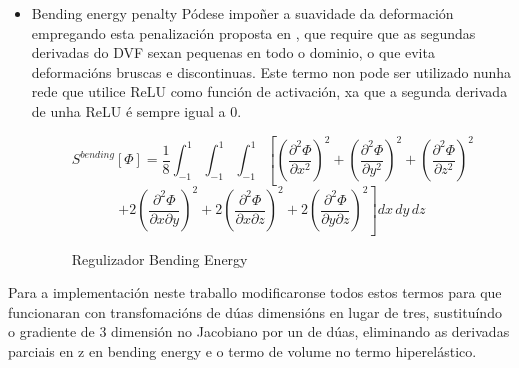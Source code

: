 \begin{itemize}
    \item Bending energy penalty
    Pódese impoñer a suavidade da deformación empregando esta penalización proposta en \cite{bendingenergy}, que 
    require que as segundas derivadas do DVF sexan pequenas en todo o dominio, o que evita deformacións bruscas e discontinuas.
    Este termo non pode ser utilizado nunha rede que utilice ReLU como función de activación, xa que a segunda derivada de unha ReLU é sempre igual a 0.

    \begin{figure}[ht!]
        \centering
        \[
        S^{bending}[\Phi] = \frac{1}{8} \int_{-1}^{1} \int_{-1}^{1} \int_{-1}^{1} \left[ \left( \frac{\partial^2 \Phi}{\partial x^2} \right)^2 + \left( \frac{\partial^2 \Phi}{\partial y^2} \right)^2 + \left( \frac{\partial^2 \Phi}{\partial z^2} \right)^2 \right.
        \]
        \[
        \left. + 2 \left( \frac{\partial^2 \Phi}{\partial x \partial y} \right)^2 + 2 \left( \frac{\partial^2 \Phi}{\partial x \partial z} \right)^2 + 2 \left( \frac{\partial^2 \Phi}{\partial y \partial z} \right)^2 \right] dx\,dy\,dz
        \]
        \caption{Regulizador Bending Energy}
    \end{figure}
    
\end{itemize}

Para a implementación neste traballo modificaronse todos estos termos para que funcionaran con transfomacións de dúas dimensións en lugar de tres,
 sustituíndo o gradiente de 3 dimensión no Jacobiano por un de dúas, eliminando as derivadas parciais en z en bending energy e o termo de volume no termo hiperelástico.

